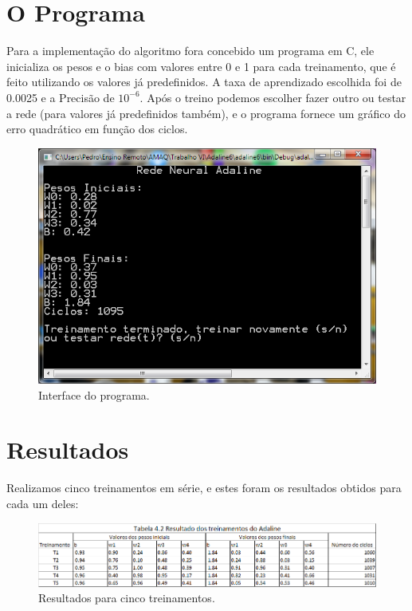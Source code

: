 \newpage
\section{O Programa}

Para a implementação do algoritmo fora concebido um programa em C, ele inicializa os pesos e o bias com valores entre 0 e 1 para cada treinamento, que é feito utilizando os valores já predefinidos. A taxa de aprendizado escolhida foi de 0.0025 e a Precisão de $10^{-6}$. Após o treino podemos escolher fazer outro ou testar a rede (para valores já predefinidos também), e o programa fornece um gráfico do erro quadrático em função dos ciclos.


\begin{figure}[H]
	\centering
	\includegraphics[scale = 0.9]{imagens/interface}
	\caption{Interface do programa.}
\end{figure}

\section{Resultados}

Realizamos cinco treinamentos em série, e estes foram os resultados obtidos para cada um deles:

\begin{figure}[H]
	\centering
	\includegraphics[scale = 0.7]{imagens/tabela4.2}
	\caption{Resultados para cinco treinamentos.}
\end{figure}

